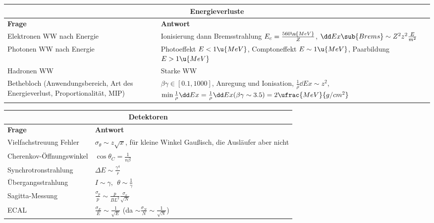 \documentclass[final]{summery_5.0}
\begin{document}
\begin{table}[H]
\centering
\begin{tabular}{|p{7cm}|p{7cm}|}
    \multicolumn{2}{c}{\large \bf Energieverluste}\\
    \hline
    \textbf{Frage} & \textbf{Antwort}\\\hline
    Elektronen WW nach Energie & Ionisierung dann Bremsstrahlung $E_c = \frac{560\u{MeV}}{Z}$, $\dd Ex\sub{Brems}\sim Z^2 z^2 \frac{E}{m^2}$\\\hline
    Photonen WW nach Energie& Photoeffekt $E<1\u{MeV}$, Comptoneffekt $E\sim 1\u{MeV}$, Paarbildung $E>1\u{MeV}$\\\hline 
    Hadronen WW & Starke WW\\ \hline
    Bethebloch (Anwendungsbereich, Art des Energieverlust, Proportionalität, MIP)& $\beta\gamma\in[0.1,1000]$, Anregung und Ionisation, $\frac{1}{\rho}\dd Ex\sim z^2$, $\min \frac{1}{\rho}\dd Ex = \frac{1}{\rho}\dd Ex(\beta\gamma \sim 3.5) =2\ufrac{MeV}{g/cm^2}$\\\hline
\end{tabular}
\end{table}


\begin{table}[H]
    \centering
    \begin{tabular}{|p{7cm}|p{7cm}|}
        \multicolumn{2}{c}{\large \bf Detektoren}\\
        \hline
        {\bf Frage} & {\bf Antwort}\\\hline
        Vielfachstreuung Fehler & $\sigma_\theta \sim z \sqrt x$, für kleine Winkel Gaußisch, die Ausläufer aber nicht\\\hline
        Cherenkov-Öffnungswinkel& $\cos\theta_C = \frac
        {1}{n\beta}$\\\hline
        Synchrotronstrahlung& $\Delta E\sim \frac{\gamma^4}{r}$\\\hline
        Übergangsstrahlung& $I \sim \gamma,\ \  \theta \sim \frac1 \gamma $\\\hline
        Sagitta-Messung & $\frac{\sigma_p}{p} \sim \frac{p}{B L^2}\frac{\sigma_x} {\sqrt N}$\\\hline
        ECAL & $\frac{\sigma_E}{E} \sim  \frac{1}{\sqrt{E}}$ (da $\sim \frac{\sigma_N}{N}\sim \frac{1}{\sqrt N}$)\\\hline
\end{tabular}
\end{table}
\end{document}
